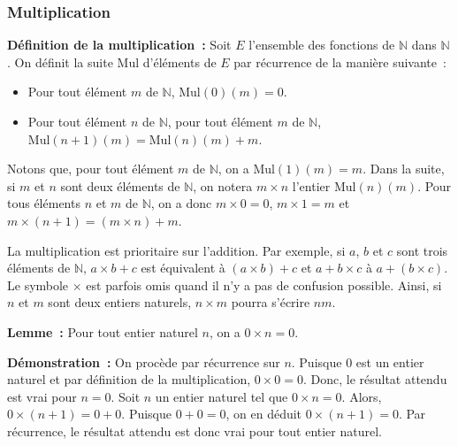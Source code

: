     \done 

\subsubsection{Multiplication}
\label{subsub:multiplication}

\noindent\textbf{Définition de la multiplication :} Soit $E$ l'ensemble des fonctions de $\mathbb{N}$ dans $\mathbb{N}$. 
    On définit la suite $\mathrm{Mul}$ d'éléments de $E$ par récurrence de la manière suivante : 
    \begin{itemize}[nosep]
        \item Pour tout élément $m$ de $\mathbb{N}$, $\mathrm{Mul}(0)(m) = 0$.
        \item Pour tout élément $n$ de $\mathbb{N}$, pour tout élément $m$ de $\mathbb{N}$, $\mathrm{Mul}(n+1)(m) = \mathrm{Mul}(n)(m) + m$.
    \end{itemize}
    Notons que, pour tout élément $m$ de $\mathbb{N}$, on a $\mathrm{Mul}(1)(m) = m$. 
    Dans la suite, si $m$ et $n$ sont deux éléments de $\mathbb{N}$, on notera $m \times n$ l'entier $\mathrm{Mul}(n)(m)$. 
    Pour tous éléments $n$ et $m$ de $\mathbb{N}$, on a donc $m \times 0 = 0$, $m \times 1 = m$ et $m \times (n+1) = (m \times n) + m$.
    
    La multiplication est prioritaire sur l'addition. 
    Par exemple, si $a$, $b$ et $c$ sont trois éléments de $\mathbb{N}$, $a \times b + c$ est équivalent à $(a \times b) + c$ et $a + b \times c$ à $a + (b \times c)$.
    Le symbole $\times$ est parfois omis quand il n'y a pas de confusion possible. 
    Ainsi, si $n$ et $m$ sont deux entiers naturels, $n \times m$ pourra s'écrire $n m$.

\medskip

\noindent\textbf{Lemme :} Pour tout entier naturel $n$, on a $0 \times n = 0$.

\medskip

\noindent\textbf{Démonstration :} On procède par récurrence sur $n$. 
    Puisque $0$ est un entier naturel et par définition de la multiplication, $0 \times 0 = 0$. 
    Donc, le résultat attendu est vrai pour $n = 0$. 
    Soit $n$ un entier naturel tel que $0 \times n = 0$. 
    Alors, $0 \times (n+1) = 0 + 0$.
    Puisque $0 + 0 = 0$, on en déduit $0 \times (n+1) = 0$. 
    Par récurrence, le résultat attendu est donc vrai pour tout entier naturel. 

   \done 

\medskip

